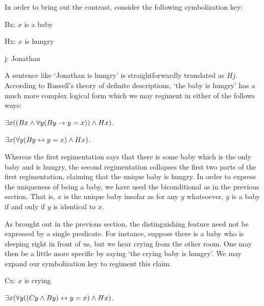 In order to bring out the contrast, consider the following symbolization key:

\begin{ekey}
  \item[Bx:] $x$ is a baby
  \item[Hx:] $x$ is hungry
  \item[j:] Jonathan
\end{ekey}

A sentence like `Jonathan is hungry' is straightforwardly translated as $Hj$.
According to Russell's theory of definite descriptions, `the baby is hungry' has a much more complex logical form which we may regiment in either of the follows ways:

\begin{earg}
  \item[\ex{Def1}] $\exists x ((Bx \wedge \forall y (By \rightarrow y = x)) \wedge Hx)$.
  \item[\ex{Def2}] $\exists x (\forall y (By \leftrightarrow y = x) \wedge Hx)$.
\end{earg}

Whereas the first regimentation says that there is some baby which is the only baby and is hungry, the second regimentation collapses the first two parts of the first regimentation, claiming that the unique baby is hungry.
In order to express the uniqueness of being a baby, we have used the biconditional as in the previous section.
That is, $x$ is the unique baby insofar as for any $y$ whatsoever, $y$ is a baby if and only if $y$ is identical to $x$.

As brought out in the previous section, the distinguishing feature need not be expressed by a single predicate.
For instance, suppose there is a baby who is sleeping right in front of us, but we hear crying from the other room.
One may then be a little more specific by saying `the crying baby is hungry'.
We may expand our symbolization key to regiment this claim.

\begin{multicols}{2}

\begin{ekey}
  \item[Cx:] $x$ is crying
\end{ekey}

\begin{earg}
  \item[\ex{Def3}] $\exists x (\forall y ((Cy \wedge By) \leftrightarrow y = x) \wedge Hx)$.
\end{earg}

\end{multicols}

